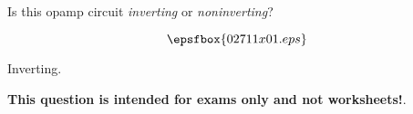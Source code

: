 

Is this opamp circuit {\it inverting} or {\it noninverting}?

$$\epsfbox{02711x01.eps}$$







Inverting.







{\bf This question is intended for exams only and not worksheets!}.




